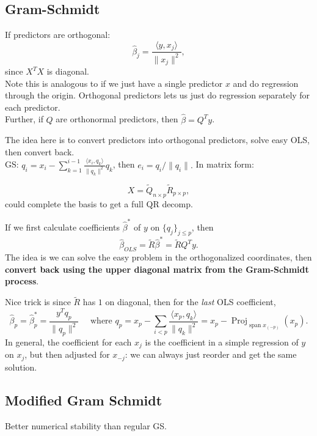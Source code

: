\documentclass{article}
\newcommand{\Proj}{\operatorname{Proj}}
\begin{document}
\subsection{Gram-Schmidt}
\begin{fact}
    If predictors are orthogonal:
    $$\hat \beta_j = \frac{\langle y, x_j \rangle }{\|x_j\|^2},$$
    since $X^T X$ is diagonal.\\
    Note this is analogous to if we just have a single predictor $x$ and do regression through the origin. Orthogonal predictors lets us just do regression separately for each predictor. \\
    Further, if $Q$ are orthonormal predictors, then $\hat \beta = Q^T y$.
\end{fact}
The idea here is to convert predictors into orthogonal predictors, solve easy OLS, then convert back. \\ 
GS: $q_i = x_i - \sum_{k=1}^{i-1} \frac{\langle x_i, q_k\rangle }{\|q_k\|^2} q_k $, then $e_i = q_i /\|q_i\|.$ In matrix form:

$$X= \tilde Q_{n\times p} \tilde R_{p \times p},$$ could complete the basis to get a full QR decomp. 
\begin{fact}
    If we first calculate coefficients $\hat \beta^*$ of $y$ on $\{q_j\}_{j\leq p}$, then $$\hat \beta_{OLS} = \tilde R \hat \beta^* = \tilde R Q^T y.$$
    The idea is we can solve the easy problem in the orthogonalized coordinates, then \textbf{convert back using the upper diagonal matrix from the Gram-Schmidt process}.
\end{fact}
Nice trick is since $\tilde R$ has $1$ on diagonal, then for the \textit{last} OLS coefficient,
$$\hat \beta_p = \hat \beta^*_p  = \frac{y^T q_p} {\|q_p\|^2} \quad \text{ where } q_p = x_p - \sum_{i<p} \frac{\langle x_p, q_k\rangle}{\|q_k\|^2} = x_p - \Proj_{\operatorname{span} x_{(-p)}}(x_p).$$
In general, the coefficient for each $x_j$ is the coefficient in a simple regression of $y$ on $x_j$, but then adjusted for $x_{-j}$: we can always just reorder and get the same solution.
\subsection{Modified Gram Schmidt}
Better numerical stability than regular GS.
\end{document}
